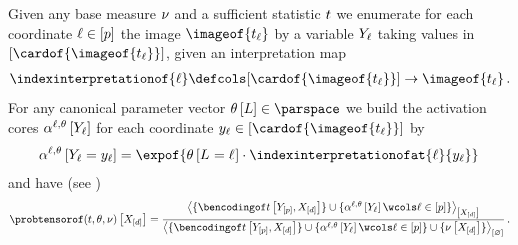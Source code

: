 \begin{theorem}
    \label{the:expFamilyTensorRep}
    Given any base measure $\nu$ and a sufficient statistic $t$ we enumerate for each coordinate $\ell\in[p]$ the image $\imageof{\sstatcoordinateof{\selindex}}$ by a variable $Y_{\ell}$ taking values in $[\cardof{\imageof{\sstatcoordinateof{\selindex}}}]$, given an interpretation map
    \begin{align*}
        \indexinterpretationof{\selindex} \defcols
        [\cardof{\imageof{\sstatcoordinateof{\selindex}}}] \rightarrow \imageof{\sstatcoordinateof{\selindex}} \, .
    \end{align*}
    For any canonical parameter vector $\canparamwithin$ we build the activation cores $\alpha^{\ell,\theta}\left[Y_{\ell}\right]$ for each coordinate $\headindexof{\selindex}\in[\cardof{\imageof{\sstatcoordinateof{\selindex}}}]$ by
    \begin{align*}
        \softactleg\left[\indexedheadvariableof{\selindex}\right]
        = \expof{\canparamat{\indexedselvariable} \cdot \indexinterpretationofat{\selindex}{\headindexof{\selindex}} } \,
    \end{align*}
    and have (see )
    \begin{align*}
        \expdistat{\shortcatvariables}
        = \frac{
            \contractionof{\{\bencsstatwith\}\cup\{\softactlegwith \wcols \selindexin\}}{\shortcatvariables}
        }{
            \contraction{\{\bencsstatwith\}\cup\{\softactlegwith \wcols \selindexin\}\cup\{\basemeasurewith\}}
        } \, .
    \end{align*}
\end{theorem}
